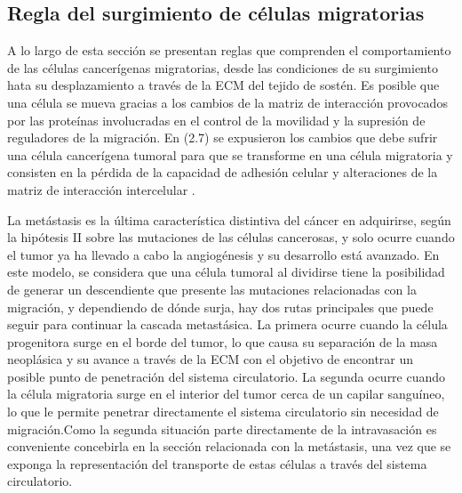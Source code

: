 \subsection{Regla del surgimiento de c\'elulas migratorias}
\label{subsec-migrant}
A lo largo de esta secci\'on se presentan reglas que comprenden el comportamiento de las c\'elulas cancer\'igenas migratorias, desde las condiciones de su surgimiento hata su desplazamiento a trav\'es de la ECM del tejido de sost\'en. Es posible que una c\'elula se mueva gracias a los cambios de la matriz de interacci\'on provocados por las prote\'inas involucradas en el control de la movilidad y la supresi\'on de reguladores de la migraci\'on. En (2.7) se expusieron los cambios que debe sufrir una c\'elula cancer\'igena tumoral para que se transforme en una c\'elula migratoria y consisten en la p\'erdida de la capacidad de adhesi\'on celular y alteraciones de la matriz de interacci\'on intercelular \cite{viabarre2019}.

La metástasis es la última característica distintiva del cáncer en adquirirse, según la hipótesis II sobre las mutaciones de las células cancerosas, y solo ocurre cuando el tumor ya ha llevado a cabo la angiogénesis y su desarrollo está avanzado. En este modelo, se considera que una célula tumoral al dividirse tiene la posibilidad de generar un descendiente que presente las mutaciones relacionadas con la migración, y dependiendo de dónde surja, hay dos rutas principales que puede seguir para continuar la cascada metastásica. La primera ocurre cuando la célula progenitora surge en el borde del tumor, lo que causa su separación de la masa neoplásica y su avance a través de la ECM con el objetivo de encontrar un posible punto de penetración del sistema circulatorio. La segunda ocurre cuando la célula migratoria surge en el interior del tumor cerca de un capilar sanguíneo, lo que le permite penetrar directamente el sistema circulatorio sin necesidad de migración.Como la segunda situaci\'on parte directamente de la intravasaci\'on es conveniente concebirla en la secci\'on relacionada con la met\'astasis, una vez que se exponga la representaci\'on del transporte de estas c\'elulas a trav\'es del sistema circulatorio.

